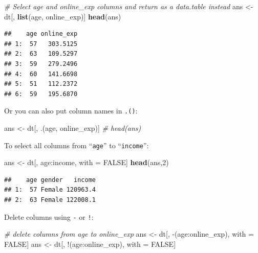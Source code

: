 \documentclass[]{book}
\newenvironment{Shaded}{\begin{snugshade}}{\end{snugshade}}
\newcommand{\KeywordTok}[1]{\textcolor[rgb]{0.13,0.29,0.53}{\textbf{{#1}}}}
\newcommand{\DecValTok}[1]{\textcolor[rgb]{0.00,0.00,0.81}{{#1}}}
\newcommand{\StringTok}[1]{\textcolor[rgb]{0.31,0.60,0.02}{{#1}}}
\newcommand{\CommentTok}[1]{\textcolor[rgb]{0.56,0.35,0.01}{\textit{{#1}}}}
\newcommand{\OtherTok}[1]{\textcolor[rgb]{0.56,0.35,0.01}{{#1}}}
\newcommand{\NormalTok}[1]{{#1}}
\theoremstyle{definition}
\theoremstyle{definition}
\theoremstyle{remark}
\begin{document}
\begin{Shaded}
\begin{Highlighting}[]
\CommentTok{# Select age and online_exp columns and return as a data.table instead}
\NormalTok{ans <-}\StringTok{ }\NormalTok{dt[, }\KeywordTok{list}\NormalTok{(age, online_exp)]}
\KeywordTok{head}\NormalTok{(ans)}
\end{Highlighting}
\end{Shaded}

\begin{verbatim}
##    age online_exp
## 1:  57   303.5125
## 2:  63   109.5297
## 3:  59   279.2496
## 4:  60   141.6698
## 5:  51   112.2372
## 6:  59   195.6870
\end{verbatim}

Or you can also put column names in \texttt{.()}:

\begin{Shaded}
\begin{Highlighting}[]
\NormalTok{ans <-}\StringTok{ }\NormalTok{dt[, .(age, online_exp)]}
\CommentTok{# head(ans)}
\end{Highlighting}
\end{Shaded}

To select all columns from ``\texttt{age}'' to ``\texttt{income}'':

\begin{Shaded}
\begin{Highlighting}[]
\NormalTok{ans <-}\StringTok{ }\NormalTok{dt[, age:income, with =}\StringTok{ }\OtherTok{FALSE}\NormalTok{]}
\KeywordTok{head}\NormalTok{(ans,}\DecValTok{2}\NormalTok{)}
\end{Highlighting}
\end{Shaded}

\begin{verbatim}
##    age gender   income
## 1:  57 Female 120963.4
## 2:  63 Female 122008.1
\end{verbatim}

Delete columns using \texttt{-} or \texttt{!}:

\begin{Shaded}
\begin{Highlighting}[]
\CommentTok{# delete columns from  age to online_exp}
\NormalTok{ans <-}\StringTok{ }\NormalTok{dt[, -(age:online_exp), with =}\StringTok{ }\OtherTok{FALSE}\NormalTok{]}
\NormalTok{ans <-}\StringTok{ }\NormalTok{dt[, !(age:online_exp), with =}\StringTok{ }\OtherTok{FALSE}\NormalTok{]}
\end{Highlighting}
\end{Shaded}
\end{document}
